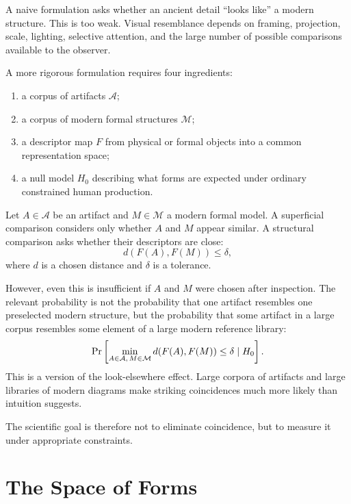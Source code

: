 A naive formulation asks whether an ancient detail ``looks like'' a modern structure. This is too weak. Visual resemblance depends on framing, projection, scale, lighting, selective attention, and the large number of possible comparisons available to the observer.

A more rigorous formulation requires four ingredients:
\begin{enumerate}[label=(\roman*)]
    \item a corpus of artifacts $\mathcal{A}$;
    \item a corpus of modern formal structures $\mathcal{M}$;
    \item a descriptor map $F$ from physical or formal objects into a common representation space;
    \item a null model $H_0$ describing what forms are expected under ordinary constrained human production.
\end{enumerate}

Let $A \in \mathcal{A}$ be an artifact and $M \in \mathcal{M}$ a modern formal model. A superficial comparison considers only whether $A$ and $M$ appear similar. A structural comparison asks whether their descriptors are close:
\begin{equation}
    d(F(A),F(M)) \leq \delta,
\end{equation}
where $d$ is a chosen distance and $\delta$ is a tolerance.

However, even this is insufficient if $A$ and $M$ were chosen after inspection. The relevant probability is not the probability that one artifact resembles one preselected modern structure, but the probability that some artifact in a large corpus resembles some element of a large modern reference library:
\begin{equation}
    \operatorname{Pr}\left[\min_{A \in \mathcal{A},\, M \in \mathcal{M}} d(F(A),F(M)) \leq \delta \mid H_0\right].
\end{equation}
This is a version of the look-elsewhere effect. Large corpora of artifacts and large libraries of modern diagrams make striking coincidences much more likely than intuition suggests.

The scientific goal is therefore not to eliminate coincidence, but to measure it under appropriate constraints.

\section{The Space of Forms}


